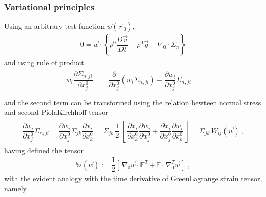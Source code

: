 \documentclass[letterpaper,10pt,english]{jupyterBook}
\begin{document}
\subsubsection{Variational principles}
\label{\detokenize{ch/continuum/balance-reference-integral:variational-principles}}
\sphinxAtStartPar
Using an arbitrary test function \(\vec{w}(\vec{r}_0)\),
\begin{equation*}
\begin{split}0 = \vec{w} \cdot \left\{ \rho^0 \dfrac{D \vec{v}}{D t} - \rho^0 \vec{g} - \nabla_0 \cdot \mathbb{\Sigma}_n \right\}\end{split}
\end{equation*}
\sphinxAtStartPar
and using rule of product
\begin{equation*}
\begin{split}\begin{aligned}
  w_i \dfrac{\partial \Sigma_{n,ji}}{\partial x^0_j} 
  & = \dfrac{\partial }{\partial x^0_j} \left( w_i \Sigma_{n, ji} \right) - \dfrac{\partial w_i}{\partial x^0_j} \Sigma_{n, ji} = \\
\end{aligned}\end{split}
\end{equation*}
\sphinxAtStartPar
and the second term can be transformed using the relation bewteen normal stress and second Piola\sphinxhyphen{}Kirchhoff tensor
\begin{equation*}
\begin{split}\begin{aligned}
  \dfrac{\partial w_i}{\partial x^0_j} \Sigma_{n, ji} = \dfrac{\partial w_i}{\partial x^0_j} \Sigma_{jk} \dfrac{\partial x_i}{\partial x^0_k}
  = \Sigma_{jk} \, \dfrac{1}{2} \, \left[ \, \dfrac{\partial x_i}{\partial x^0_k} \dfrac{\partial w_i}{\partial x^0_j} + \dfrac{\partial x_i}{\partial x^0_j} \dfrac{\partial w_i}{\partial x^0_k} \, \right] = \Sigma_{jk} \, W_{ij}(\vec{w}) \ ,
\end{aligned}\end{split}
\end{equation*}
\sphinxAtStartPar
having defined the tensor
\begin{equation*}
\begin{split}\mathbb{W}(\vec{w}) := \dfrac{1}{2} \left[ \, \nabla_0 \vec{w} \cdot \mathbb{F}^T + \mathbb{F} \cdot \nabla^T_0 \vec{w} \, \right] \ ,\end{split}
\end{equation*}
\sphinxAtStartPar
with the evident analogy with the time derivative of Green\sphinxhyphen{}Lagrange strain tensor, namely
\end{document}
